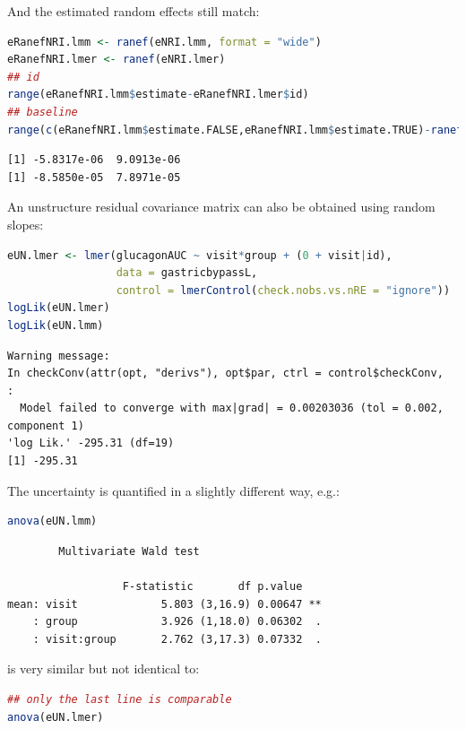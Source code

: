 \documentclass[12pt]{article}
\begin{document}
And the estimated random effects still match:
\begin{lstlisting}[language=r,numbers=none]
eRanefNRI.lmm <- ranef(eNRI.lmm, format = "wide")
eRanefNRI.lmer <- ranef(eNRI.lmer)
## id
range(eRanefNRI.lmm$estimate-eRanefNRI.lmer$id)
## baseline
range(c(eRanefNRI.lmm$estimate.FALSE,eRanefNRI.lmm$estimate.TRUE)-ranef(eNRI.lmer)$`baseline:id`)
\end{lstlisting}

\label{}
\begin{verbatim}
[1] -5.8317e-06  9.0913e-06
[1] -8.5850e-05  7.8971e-05
\end{verbatim}


\clearpage

An unstructure residual covariance matrix can also be obtained using
random slopes:
\begin{lstlisting}[language=r,numbers=none]
eUN.lmer <- lmer(glucagonAUC ~ visit*group + (0 + visit|id),
                 data = gastricbypassL,
                 control = lmerControl(check.nobs.vs.nRE = "ignore"))
logLik(eUN.lmer)
logLik(eUN.lmm)
\end{lstlisting}

\label{}
\begin{verbatim}
Warning message:
In checkConv(attr(opt, "derivs"), opt$par, ctrl = control$checkConv,  :
  Model failed to converge with max|grad| = 0.00203036 (tol = 0.002, component 1)
'log Lik.' -295.31 (df=19)
[1] -295.31
\end{verbatim}


The uncertainty is quantified in a slightly different way, e.g.:
\begin{lstlisting}[language=r,numbers=none]
anova(eUN.lmm)
\end{lstlisting}

\label{}
\begin{verbatim}
		Multivariate Wald test 

                  F-statistic       df p.value   
mean: visit             5.803 (3,16.9) 0.00647 **
    : group             3.926 (1,18.0) 0.06302  .
    : visit:group       2.762 (3,17.3) 0.07332  .
\end{verbatim}


is very similar but not identical to:
\begin{lstlisting}[language=r,numbers=none]
## only the last line is comparable
anova(eUN.lmer)
\end{lstlisting}
\end{document}
